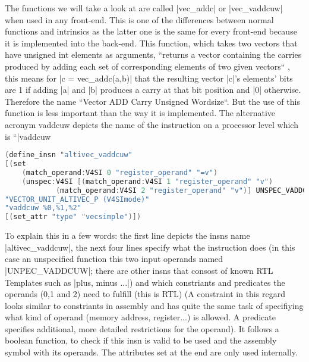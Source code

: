 The functions we will take a look at are called |vec_addc| or |vec_vaddcuw| when used in any front-end. This is one of the differences between normal functions and intrinsics as the latter one is the same for every front-end because it is implemented into the back-end.
This function, which takes two vectors that have unsigned int elements as arguments, ``returns a vector containing the carries produced by adding each set of corresponding elements of two given vectors`` , this means for |c = vec_addc(a,b)| that the resulting vector |c|'s elements' bits are 1 if adding |a| and |b| produces a carry at that bit position and |0| otherwise. Therefore the name ``Vector ADD Carry Unsigned Wordsize``. But the use of this function is less important than the way it is implemented\cite{ibmvecbuiltins}.
The alternative acronym vaddcuw depicts the name of the instruction on a processor level which is ``|vaddcuw  %
\begin{lstlisting}[language=C++,basicstyle=\ttfamily\scriptsize,keywordstyle=\color{red}]
(define_insn "altivec_vaddcuw"
[(set
	(match_operand:V4SI 0 "register_operand" "=v")
	(unspec:V4SI [(match_operand:V4SI 1 "register_operand" "v")
			(match_operand:V4SI 2 "register_operand" "v")] UNSPEC_VADDCUW))]
"VECTOR_UNIT_ALTIVEC_P (V4SImode)"
"vaddcuw %0,%1,%2"
[(set_attr "type" "vecsimple")])
\end{lstlisting}
To explain this in a few words: the first line depicts the insns name |altivec_vaddcuw|, the next four lines specify what the instruction does (in this case an unspecified function this two input operands named |UNPEC_VADDCUW|; there are other insns that consost of known RTL Templates such as |plus, minus ...|)  and which constriants and predicates the operands (0,1 and 2) need to fulfill (this is RTL) (A constraint in this regard looks similar to constriants in assembly and has quite the same task of specifiying what kind of operand (memory address, register...) is allowed. A predicate specifies additional, more detailed restrictions for the operand). It follows a boolean function, to check if this insn is valid to be used and the assembly symbol with its operands. The attributes set at the end are only used internally.

